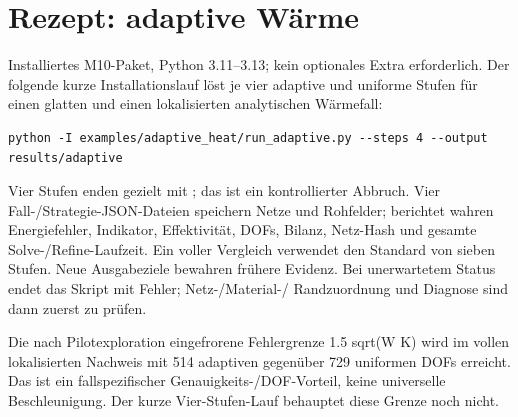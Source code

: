 \chapter{Rezept: adaptive Wärme}\label{recipe:adaptive-heat}
Installiertes M10-Paket, Python 3.11--3.13; kein optionales Extra erforderlich.
Der folgende kurze Installationslauf löst je vier adaptive und uniforme Stufen
für einen glatten und einen lokalisierten analytischen Wärmefall:
\begin{lstlisting}
python -I examples/adaptive_heat/run_adaptive.py --steps 4 --output results/adaptive
\end{lstlisting}
Vier Stufen enden gezielt mit ; das ist ein kontrollierter
Abbruch. Vier Fall-/Strategie-JSON-Dateien speichern Netze und Rohfelder;
 berichtet wahren Energiefehler, Indikator, Effektivität,
DOFs, Bilanz, Netz-Hash und gesamte Solve-/Refine-Laufzeit. Ein voller Vergleich
verwendet den Standard von sieben Stufen. Neue Ausgabeziele bewahren frühere
Evidenz. Bei unerwartetem Status endet das Skript mit Fehler; Netz-/Material-/
Randzuordnung und Diagnose sind dann zuerst zu prüfen.

Die nach Pilotexploration eingefrorene Fehlergrenze 1.5 sqrt(W K) wird im vollen
lokalisierten Nachweis mit 514 adaptiven gegenüber 729 uniformen DOFs erreicht.
Das ist ein fallspezifischer Genauigkeits-/DOF-Vorteil, keine universelle
Beschleunigung. Der kurze Vier-Stufen-Lauf behauptet diese Grenze noch nicht.

